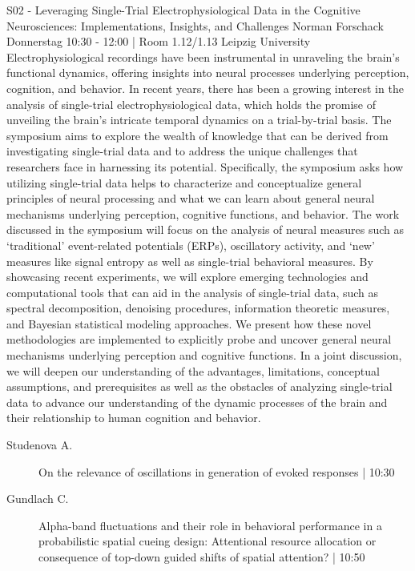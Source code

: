 
            \begin{symposium}
            {S02 - Leveraging Single-Trial Electrophysiological Data in the Cognitive Neurosciences: Implementations, Insights, and Challenges}
            {Norman Forschack}
            {Donnerstag 10:30 - 12:00 | Room 1.12/1.13}
            {Leipzig University}
            Electrophysiological recordings have been instrumental in unraveling the brain's functional dynamics, offering insights into neural processes underlying perception, cognition, and behavior. In recent years, there has been a growing interest in the analysis of single-trial electrophysiological data, which holds the promise of unveiling the brain's intricate temporal dynamics on a trial-by-trial basis. The symposium aims to explore the wealth of knowledge that can be derived from investigating single-trial data and to address the unique challenges that researchers face in harnessing its potential.
Specifically, the symposium asks how utilizing single-trial data helps to characterize and conceptualize general principles of neural processing and what we can learn about general neural mechanisms underlying perception, cognitive functions, and behavior. The work discussed in the symposium will focus on the analysis of neural measures such as ‘traditional’ event-related potentials (ERPs), oscillatory activity, and ‘new’ measures like signal entropy as well as single-trial behavioral measures. By showcasing recent experiments, we will explore emerging technologies and computational tools that can aid in the analysis of single-trial data, such as spectral decomposition, denoising procedures, information theoretic measures, and Bayesian statistical modeling approaches. We present how these novel methodologies are implemented to explicitly probe and uncover general neural mechanisms underlying perception and cognitive functions. In a joint discussion, we will deepen our understanding of the advantages, limitations, conceptual assumptions, and prerequisites as well as the obstacles of analyzing single-trial data to advance our understanding of the dynamic processes of the brain and their relationship to human cognition and behavior.
            \begin{description}    
            
                \item [ Studenova A.] On the relevance of oscillations in generation of evoked responses \textcolor{mygray}{ | 10:30}    
                
                \item [ Gundlach C.] Alpha-band fluctuations and their role in behavioral performance in a probabilistic spatial cueing design: Attentional resource allocation or consequence of top-down guided shifts of spatial attention? \textcolor{mygray}{ | 10:50}    
                

\end{description}
\end{symposium}
